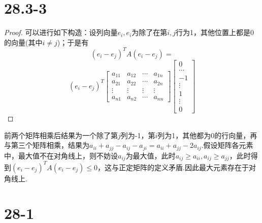 \documentclass[twocolumn]{article}
\newenvironment{SChinese}{%
	\CJKfamily{gbsn}%
	\CJKtilde
	\CJKnospace}{}
\begin{document}
\begin{CJK}{UTF8}{}
\begin{SChinese}
			\section*{28.3-3}
				\begin{proof}
					可以进行如下构造：设列向量$e_i,e_i$为除了在第$i,j$行为1，其他位置上都是0的向量(其中$i\neq j$)；于是有\begin{displaymath}
					(e_i-e_j)^TA(e_i-e_j)=
					\end{displaymath}
					\begin{displaymath}
					(e_i-e_j)^T\left [\begin{matrix}
					a_{11} & a_{12} & \cdots & a_{1n} \\
					a_{21} & a_{22} & \cdots & a_{2n} \\
					\vdots & \vdots & \vdots & \vdots \\
					a_{n1} & a_{n2} & \cdots & a_{nn}
					\end{matrix}\right]\left [\begin{matrix}
					0 \\ \cdots \\ -1 \\ \vdots \\ 1 \\ \vdots \\ 0
					\end{matrix}\right] 
					\end{displaymath}
				\end{proof}
				前两个矩阵相乘后结果为一个除了第$j$列为-1，第$i$列为1，其他都为0的行向量，再与第三个矩阵相乘，结果为$a_{ii}+a_{jj}-a_{ij}-a_{ji}=a_{ii}+a_{jj}-2a_{ij}$.假设矩阵各元素中，最大值不在对角线上，则不妨设$a_{ij}$为最大值，此时$a_{ij}\ge a_{ii},a_{ij}\ge a_{jj}$，此时得到$(e_i-e_j)^TA(e_i-e_j)\le0$，这与正定矩阵的定义矛盾.因此最大元素存在于对角线上.
			\section*{28-1}

\end{SChinese}
\end{CJK}
\end{document}
